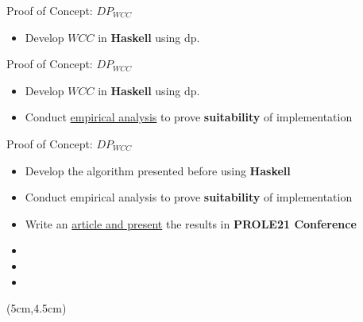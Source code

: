 \begin{frame}[fragile]{Proof of Concept: $DP_{WCC}$}
  \begin{itemize}
    \item Develop \underline{\color{red}$WCC$} in \textbf{Haskell} using \acrshort{dp}.
  \end{itemize}
\end{frame}

\begin{frame}[fragile]{Proof of Concept: $DP_{WCC}$}
  \begin{itemize}
    \setlength\itemsep{2em}
    \item {\color{light}Develop $WCC$ in \textbf{Haskell} using \acrshort{dp}.}
    \item Conduct \underline{\color{red}empirical analysis} to prove \textbf{suitability} of implementation
  \end{itemize}
\end{frame}

\begin{frame}[fragile]{Proof of Concept: $DP_{WCC}$}
  \begin{itemize}
    \setlength\itemsep{2em}
    \item {\color{light}Develop the algorithm presented before using \textbf{Haskell}}
    \item {\color{light}Conduct empirical analysis to prove \textbf{suitability} of implementation}
    \item Write an \underline{\color{red}article and present} the results in \textbf{PROLE21 Conference}~\cite{prole:2021:017}
    \item[]
    \item[]
    \item[]
  \end{itemize}
  \begin{textblock*}{7cm}(5cm,4.5cm) %
  \end{textblock*}
\end{frame}

